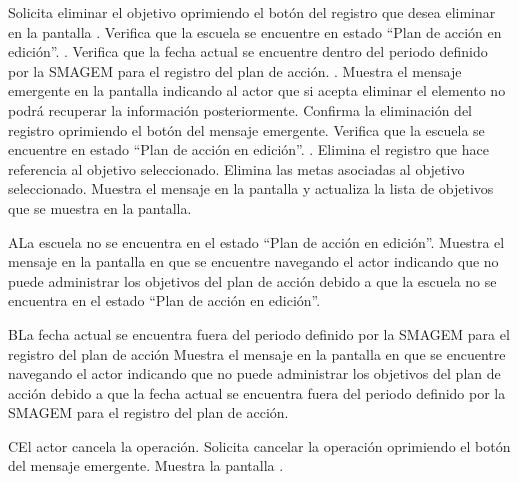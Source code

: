  \begin{UCtrayectoria}
\UCpaso[\UCactor] Solicita eliminar el objetivo oprimiendo el botón \botKo  del registro que desea eliminar en la pantalla .
	\UCpaso[\UCsist] Verifica que la escuela se encuentre en  estado ``Plan de acción en edición''. .
    \UCpaso[\UCsist] Verifica que la fecha actual se encuentre dentro del periodo definido por la SMAGEM para el registro del plan de acción. .
\UCpaso[\UCsist] Muestra el mensaje emergente  en la pantalla  indicando al actor que si acepta eliminar 
el elemento no podrá recuperar la información posteriormente.
\UCpaso[\UCactor] Confirma la eliminación del registro oprimiendo el botón  del mensaje emergente. 
\UCpaso[\UCsist] Verifica que la escuela se encuentre en  estado ``Plan de acción en edición''. .
\UCpaso[\UCsist] Elimina el registro que hace referencia al objetivo seleccionado.
\UCpaso[\UCsist] Elimina las metas asociadas al objetivo seleccionado.
\UCpaso[\UCsist] Muestra el mensaje  en la pantalla  
 y actualiza la lista de objetivos que se muestra en la pantalla.
 \end{UCtrayectoria}
 
 
 \begin{UCtrayectoriaA}{A}{La escuela no se encuentra en el estado ``Plan de acción en edición''.}
    \UCpaso[\UCsist] Muestra el mensaje  en la pantalla en que se encuentre navegando el actor indicando que no puede administrar los objetivos del plan de acción debido a que la escuela no se encuentra en el estado ``Plan de acción en edición''. 
 \end{UCtrayectoriaA}
 
   \begin{UCtrayectoriaA}{B}{La fecha actual se encuentra fuera del periodo definido por la SMAGEM para el registro del plan de acción}
    \UCpaso[\UCsist] Muestra el mensaje  en la pantalla en que se encuentre navegando el actor indicando que no puede administrar los objetivos del plan de acción debido a que la fecha actual se encuentra fuera del periodo definido por la SMAGEM para el registro del plan de acción.
 \end{UCtrayectoriaA}
\begin{UCtrayectoriaA}{C}{El actor cancela la operación.}
	\UCpaso[\UCactor] Solicita cancelar la operación oprimiendo el botón  del mensaje emergente.
	\UCpaso[\UCsist] Muestra la pantalla .
\end{UCtrayectoriaA}
  
